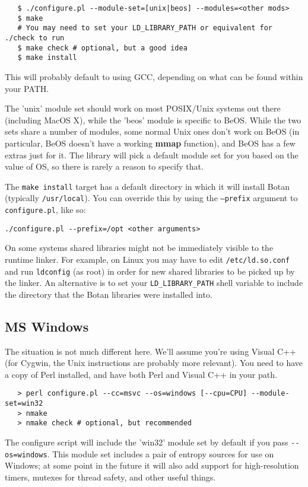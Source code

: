\documentclass{article}
\newcommand{\filename}[1]{\texttt{#1}}
\newcommand{\function}[1]{\textbf{#1}}
\begin{document}
\begin{verbatim}
   $ ./configure.pl --module-set=[unix|beos] --modules=<other mods>
   $ make
   # You may need to set your LD_LIBRARY_PATH or equivalent for ./check to run
   $ make check # optional, but a good idea
   $ make install
\end{verbatim}

This will probably default to using GCC, depending on what can be
found within your PATH.

The 'unix' module set should work on most POSIX/Unix systems out there
(including MacOS X), while the 'beos' module is specific to BeOS. While the two
sets share a number of modules, some normal Unix ones don't work on BeOS (in
particular, BeOS doesn't have a working \function{mmap} function), and BeOS has
a few extras just for it. The library will pick a default module set for you
based on the value of OS, so there is rarely a reason to specify that.

The \verb|make install| target has a default directory in which it
will install Botan (typically \verb|/usr/local|). You can override
this by using the \texttt{--prefix} argument to
\filename{configure.pl}, like so:

\verb|./configure.pl --prefix=/opt <other arguments>|

On some systems shared libraries might not be immediately visible to
the runtime linker. For example, on Linux you may have to edit
\filename{/etc/ld.so.conf} and run \texttt{ldconfig} (as root) in
order for new shared libraries to be picked up by the linker. An
alternative is to set your \texttt{LD\_LIBRARY\_PATH} shell variable
to include the directory that the Botan libraries were installed into.

\subsection{MS Windows}

The situation is not much different here. We'll assume you're using Visual C++
(for Cygwin, the Unix instructions are probably more relevant). You need to
have a copy of Perl installed, and have both Perl and Visual C++ in your path.

\begin{verbatim}
   > perl configure.pl --cc=msvc --os=windows [--cpu=CPU] --module-set=win32
   > nmake
   > nmake check # optional, but recommended
\end{verbatim}

The configure script will include the 'win32' module set by default if
you pass \verb|--os=windows|. This module set includes a pair of
entropy sources for use on Windows; at some point in the future it
will also add support for high-resolution timers, mutexes for thread
safety, and other useful things.
\end{document}
